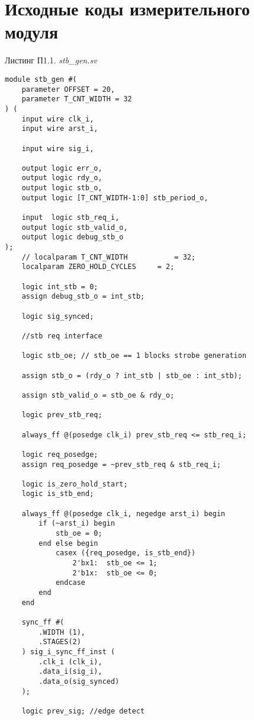 \chapter{Исходные коды измерительного модуля}\label{appendix-MikTeX-TexStudio}							%

\begin{flushright}
Листинг П1.1. \emph{stb\_gen.sv}
\end{flushright}

\begin{lstlisting}
module stb_gen #(
	parameter OFFSET = 20,
	parameter T_CNT_WIDTH = 32
) (
	input wire clk_i,
	input wire arst_i,

	input wire sig_i,

	output logic err_o,
	output logic rdy_o,
	output logic stb_o,
	output logic [T_CNT_WIDTH-1:0] stb_period_o,

	input  logic stb_req_i,
	output logic stb_valid_o,
	output logic debug_stb_o
);
	// localparam T_CNT_WIDTH 			= 32;
	localparam ZERO_HOLD_CYCLES 	= 2;

	logic int_stb = 0;
	assign debug_stb_o = int_stb;

	logic sig_synced;

	//stb req interface

	logic stb_oe; // stb_oe == 1 blocks strobe generation

	assign stb_o = (rdy_o ? int_stb | stb_oe : int_stb);	

	assign stb_valid_o = stb_oe & rdy_o;

	logic prev_stb_req;

	always_ff @(posedge clk_i) prev_stb_req <= stb_req_i;

	logic req_posedge;
	assign req_posedge = ~prev_stb_req & stb_req_i;

	logic is_zero_hold_start;
	logic is_stb_end;

	always_ff @(posedge clk_i, negedge arst_i) begin
		if (~arst_i) begin
			stb_oe = 0;
		end else begin
			casex ({req_posedge, is_stb_end})			
				2'bx1:  stb_oe <= 1;
				2'b1x:	stb_oe <= 0;
			endcase
		end
	end

	sync_ff #(
		.WIDTH (1),
		.STAGES(2)
	) sig_i_sync_ff_inst (
		.clk_i (clk_i),
		.data_i(sig_i),
		.data_o(sig_synced)
	);

	logic prev_sig; //edge detect


\end{lstlisting}
